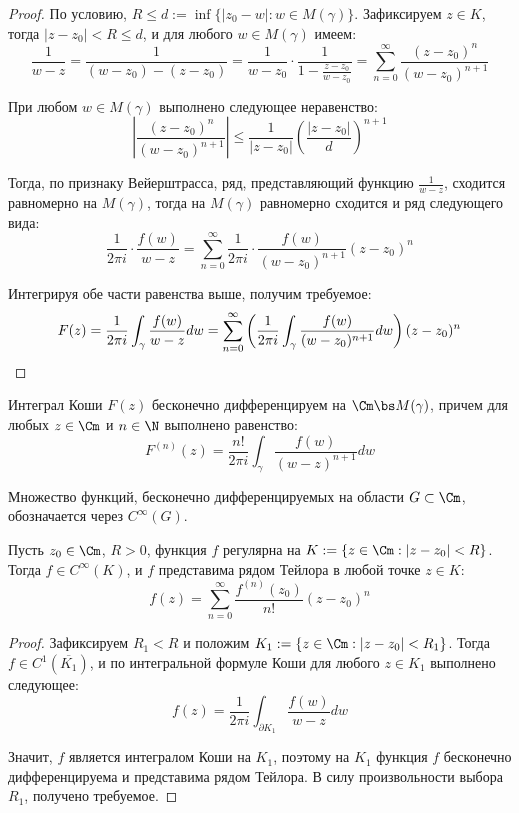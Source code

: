 \begin{proof}
	По условию, $R \le d := \inf\{|z_0 - w| : w \in M(\gamma)\}$. Зафиксируем $z \in K$, тогда $|z - z_0| < R \le d$, и для любого $w \in M(\gamma)$ имеем:
	\[\frac1{w - z} = \frac1{(w-z_0) - (z - z_0)} = \frac1{w-z_0}\cdot \frac1{1 - \frac{z-z_0}{w - z_0}} = \sum_{n=0}^\infty\frac{(z-z_0)^n}{(w-z_0)^{n + 1}}\]
	
	При любом $w \in M(\gamma)$ выполнено следующее неравенство:
	\[\left|\frac{(z-z_0)^n}{(w-z_0)^{n + 1}}\right| \le \frac{1}{|z - z_0|}\left(\frac{|z - z_0|}{d}\right)^{n+1}\]
	
	Тогда, по признаку Вейерштрасса, ряд, представляющий функцию $\frac1{w - z}$, сходится равномерно на $M(\gamma)$, тогда на $M(\gamma)$ равномерно сходится и ряд следующего вида:
	\[\frac1{2\pi i} \cdot\frac{f(w)}{w-z} = \sum_{n=0}^\infty\frac1{2\pi i}\cdot \frac{f(w)}{(w-z_0)^{n + 1}}(z-z_0)^n\]
	
	Интегрируя обе части равенства выше, получим требуемое:
	\[F(z) = \frac1{2\pi i} \int_\gamma \frac{f(w)}{w-z}dw = \sum_{n=0}^\infty\left(\frac1{2\pi i} \int_\gamma\frac{f(w)}{(w-z_0)^{n + 1}}dw\right)(z-z_0)^n \qedhere\]
\end{proof}

\begin{corollary}
	Интеграл Коши $F(z)$ бесконечно дифференцируем на $\Cm \bs M(\gamma)$, причем для любых $z \in \Cm$ и $n \in \N$ выполнено равенство:
	\[F^{(n)}(z) = \frac{n!}{2\pi i} \int_\gamma\frac{f(w)}{(w-z)^{n + 1}}dw\]
\end{corollary}

\begin{definition}
	Множество функций, бесконечно дифференцируемых на области $G \subset \Cm$, обозначается через $C^\infty(G)$.
\end{definition}

\begin{theorem}
	Пусть $z_0 \in \Cm$, $R > 0$, функция $f$ регулярна на $K := \{z \in \Cm : |z - z_0| < R\}$. Тогда $f \in C^\infty(K)$, и $f$ представима рядом Тейлора в любой точке $z \in K$:
	\[f(z) = \sum_{n = 0}^\infty \frac{f^{(n)}(z_0)}{n!}(z - z_0)^n\]
\end{theorem}

\begin{proof}
	Зафиксируем $R_1 < R$ и положим $K_1 := \{z \in \Cm: |z - z_0| < R_1\}$. Тогда $f \in C^1(\overline{K_1})$, и по интегральной формуле Коши для любого $z \in K_1$ выполнено следующее:
	\[f(z) = \frac{1}{2\pi i}\int_{\partial K_1}\frac{f(w)}{w - z}dw\]
	
	Значит, $f$ является интегралом Коши на $K_1$, поэтому на $K_1$ функция $f$ бесконечно дифференцируема и представима рядом Тейлора. В силу произвольности выбора $R_1$, получено требуемое.
\end{proof}

